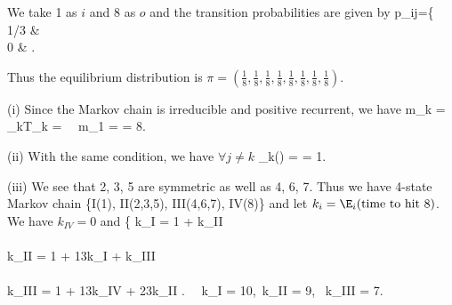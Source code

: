 
We take 1 as $i$ and 8 as $o$ and the transition probabilities are given by
\be
p_{ij}=\left\{
1/3 \quad \quad &\\
0 & 
\ea
\right.\quad\quad
\ee

Thus the equilibrium distribution is $\pi = (\frac 18, \frac 18,\frac 18,\frac 18,\frac 18,\frac 18,\frac 18,\frac 18)$.

(i) Since the Markov chain is irreducible and positive recurrent, we have
\be
m_k = \E_kT_k = \ \ra \ m_1 =  = 8.
\ee

(ii) With the same condition, we have $\forall j\neq k$
\be
\E_k() =  = 1.
\ee

(iii) We see that 2, 3, 5 are symmetric as well as 4, 6, 7. Thus we have 4-state Markov chain \{I(1), II(2,3,5), III(4,6,7), IV(8)\} and let $k_i=\E_i(\text{time to hit 8})$. We have $k_{IV}=0$ and
\be
\left\{
k_I = 1 + k_{II} \\
\\
k_{II} = 1 + \frac 13k_I +  k_{III}\\
\\
k_{III} = 1 + \frac 13k_{IV} + \frac 23k_{II}
\ea\right. \ \ra \
k_I = 10,\ k_{II} = 9, \ k_{III} = 7.
\ee

